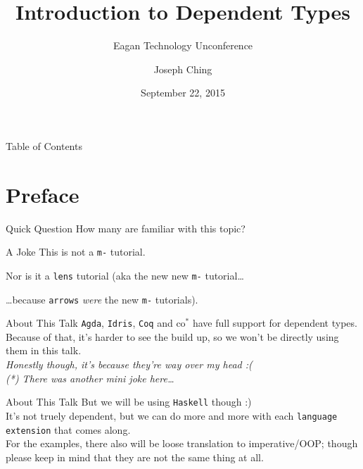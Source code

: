 \documentclass[xcolor={usenames,dvipsnames}]{beamer}
\title{Introduction to Dependent Types}
\subtitle{Eagan Technology Unconference}
\author{Joseph Ching}
\date{September 22, 2015}
\begin{document}
\begin{frame}[plain]
  \titlepage
\end{frame}


\begin{frame}{Table of Contents}
  \tableofcontents[pausesections]
\end{frame}


\section{Preface}

\begin{frame}{Quick Question}
  How many are familiar with this topic?
\end{frame}

\begin{frame}{A Joke}
  This is not a \texttt{m-} tutorial.

  \pause

  Nor is it a \texttt{lens} tutorial
  \pause
  (aka the new new \texttt{m-} tutorial\ldots

  \pause
  \ldots because \texttt{arrows} \textit{were} the new \texttt{m-} tutorials).

\end{frame}


\begin{frame}{About This Talk}
    \texttt{Agda}, \texttt{Idris}, \texttt{Coq} and co$^*$ have full support for dependent types.\\
    \pause
    Because of that, it's harder to see the build up, so we won't be directly using them in this talk.\\
    \pause
    \textit{\tiny{Honestly though, it's because they're way over my head :(}}\\
    \textit{\tiny{(*) There was another mini joke here\ldots}}
\end{frame}

\begin{frame}{About This Talk}
  But we will be using \texttt{Haskell} though :)\\
  \pause
  It's not truely dependent, but we can do more and more with each \texttt{language extension} that comes along.\\
  For the examples, there also will be loose translation to imperative/OOP; though please keep in mind that they are not the same thing at all.
\end{frame}
\end{document}
